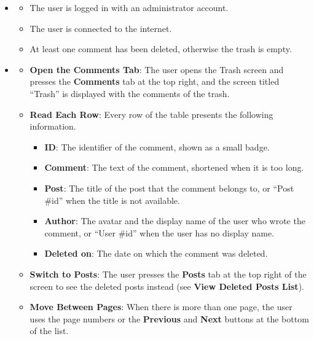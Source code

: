 \begin{itemize}[leftmargin=1.6em,topsep=4pt,itemsep=3pt,parsep=0pt,label=$\bullet$]
    \item {}
        \begin{itemize}[leftmargin=2.2em,topsep=2pt,itemsep=3pt,parsep=0pt,label=$\circ$]
            \item The user is logged in with an administrator account.
            \item The user is connected to the internet.
            \item At least one comment has been deleted, otherwise the trash is empty.
        \end{itemize}
    \item {}
        \begin{itemize}[leftmargin=2.2em,topsep=2pt,itemsep=3pt,parsep=0pt,label=$\circ$]
            \item \textbf{Open the Comments Tab}: The user opens the Trash screen and presses the \textbf{Comments} tab at the top right, and the screen titled ``Trash'' is displayed with the comments of the trash.
            \item \textbf{Read Each Row}: Every row of the table presents the following information.
                \begin{itemize}[leftmargin=2.2em,topsep=2pt,itemsep=3pt,parsep=0pt,label=$\blacksquare$]
                    \item \textbf{ID}: The identifier of the comment, shown as a small badge.
                    \item \textbf{Comment}: The text of the comment, shortened when it is too long.
                    \item \textbf{Post}: The title of the post that the comment belongs to, or ``Post \#id'' when the title is not available.
                    \item \textbf{Author}: The avatar and the display name of the user who wrote the comment, or ``User \#id'' when the user has no display name.
                    \item \textbf{Deleted on}: The date on which the comment was deleted.
                \end{itemize}
            \item \textbf{Switch to Posts}: The user presses the \textbf{Posts} tab at the top right of the screen to see the deleted posts instead (see \textbf{View Deleted Posts List}).
            \item \textbf{Move Between Pages}: When there is more than one page, the user uses the page numbers or the \textbf{Previous} and \textbf{Next} buttons at the bottom of the list.

\end{itemize}
\end{itemize}
